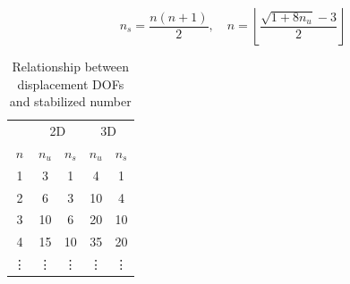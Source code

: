 \begin{equation}
    n_s = \frac{n(n + 1)}{2} 
    ,\quad
    n = \left \lfloor \frac{\sqrt{1 + 8n_u} - 3}{2} \right \rfloor 
\end{equation}

\begin{table}[ht!]
\centering
\caption{Relationship between displacement DOFs and stabilized number}
\label{tab:constraint}
\begin{tabular}{ccccc}
\toprule
    & \multicolumn{2}{c}{2D} & \multicolumn{2}{c}{3D} \\
    \cmidrule{2-3} \cmidrule{4-5}
    $n$ & $n_u$ & $n_s$ & $n_u$ & $n_s$ \\
\midrule
1 & 3  & 1  & 4  & 1 \\
2 & 6  & 3  & 10 & 4 \\
3 & 10 & 6  & 20 & 10\\
4 & 15 & 10 & 35 & 20\\
\vdots & \vdots & \vdots & \vdots & \vdots \\
\bottomrule
\end{tabular}
\end{table}


